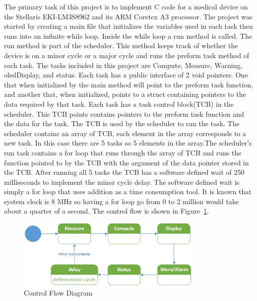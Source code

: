 \documentclass[12pt]{article} %
\begin{document}
The primary task of this project is to implement C code for a medical device on
the Stellaris EKI-LM3S8962 and its ARM Coretex A3 processor. The project was
started by creating a main file that initializes the variables used in each
task then runs into an infinite while loop. Inside the while loop a run method
is called. The run method is part of the scheduler. This method keeps track of
whether the device is on a minor cycle or a major cycle and runs the preform
task method of each task. The tasks included in this project are Compute,
Measure, Warning, oledDisplay, and status. Each task has a public interface of
2 void pointers. One that when initialized by the main method will point to the
preform task function, and another that, when initialized, points to a struct
containing pointers to the data required by that task. Each task has a task
control block(TCB) in the scheduler. This TCB points contains pointers to the
preform task function and the data for the task. The TCB is used by the
scheduler to run the task. The scheduler contains an array of TCB, each element
in the array corresponds to a new task. In this case there are 5 tasks so 5
elements in the array.The scheduler's run task contains a for loop that runs
through the array of TCB and runs the function pointed to by the TCB with the
argument of the data pointer stored in the TCB. After running all 5 tasks the
TCB has a software defined wait of 250 milliseconds to implement the minor
cycle delay. The software defined wait is simply a for loop that uses addition
as a time consumption tool. It is known that system clock is 8 MHz so having a
for loop go from 0 to 2 million would take about a quarter of a second. The
control flow is shown in Figure~\ref{fig:Control}. 

\begin{figure}[h]
    \centering
    \includegraphics[width=0.8\textwidth]{../design/Control_state_diagram.png}
    \caption{Control Flow Diagram}
    \label{fig:Control}
\end{figure}
\end{document}
